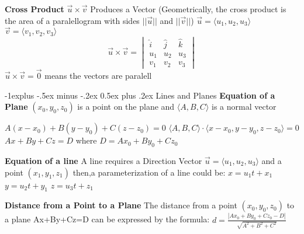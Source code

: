 \documentclass[10pt,landscape]{article}
\makeatletter
\renewcommand{\subsection}{\@startsection{subsection}{2}{0mm}%
                                {-1explus -.5ex minus -.2ex}%
                                {0.5ex plus .2ex}%
                                {\normalfont\normalsize\bfseries}}
\makeatother
\begin{document}
\begin{multicols*}{5}
\textbf{Cross Product}\newline
$\vec{u} \times \vec{v}$\newline
Produces a Vector\newline
(Geometrically, the cross product is the area of a paralellogram with sides $ ||\vec{u}|| $ and $ ||\vec{v}|| $)\newline
$\vec{u} = \langle u_1, u_2, u_3 \rangle$\newline
$\vec{v} = \langle v_1, v_2, v_3 \rangle$\newline
\[
\vec{u} \times \vec{v} = 
\begin{vmatrix}
\hat{i} & \hat{j} & \hat{k} \\
u_1 & u_2 & u_3 \\
v_1 & v_2 & v_3
\end{vmatrix}
\]\newline 
$ \vec{u} \times \vec{v} = \vec{0} $ means the vectors are paralell

\subsection {Lines and Planes}
\textbf{Equation of a Plane}\newline
$ (x_0, y_0, z_0) $ is a point on the plane and $ \langle A,B,C \rangle$ is a normal vector\newline

$A(x-x_0)+B(y-y_0)+C(z-z_0) = 0$\newline
$ \langle A,B,C \rangle \cdot \langle x-x_0, y-y_0, z-z_0 \rangle = 0 $\newline
$ Ax+By+Cz = D $ where $ D=Ax_0+By_0+Cz_0 $\newline

\textbf{Equation of a line}\newline
A line requires a Direction Vector $ \vec{u}=\langle u_1,u_2,u_3 \rangle$ and a point $(x_1,y_1,z_1)$\newline
then,\newline a parameterization of a line could be:\newline
$ x = u_1t+x_1 $\newline
$ y = u_2t+y_1 $\newline
$ z = u_3t+z_1 $\newline

\textbf{Distance from a Point to a Plane}\newline
The distance from a point $(x_0,y_0,z_0)$ to a plane Ax+By+Cz=D can be expressed by the formula:\newline
$ d=\frac{|Ax_0+By_0+Cz_0-D|}{\sqrt{A^2+B^2+C^2}} $\newline



\end{multicols*}
\end{document}
